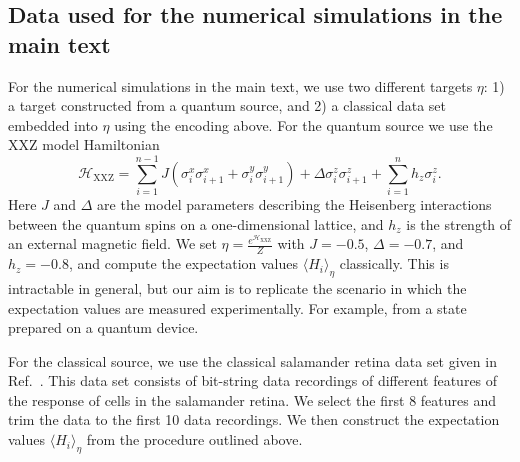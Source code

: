\documentclass[
    aps,
    prx,
    floatfix,
    nofootinbib,
    onecolumn
]{revtex4-2}
\begin{document}
\subsection{Data used for the numerical simulations in the main text}
\label{app:numdatasets}

For the numerical simulations in the main text, we use two different targets $\eta$: 1) a target constructed from a quantum source, and 2) a classical data set embedded into $\eta$ using the encoding above. For the quantum source we use the XXZ model Hamiltonian 
\begin{equation}\label{eq:xxz}
    \mathcal{H}_{\mathrm{XXZ}} =\sum_{i=1}^{n-1}J\left(\sigma^{x}_i\sigma^{x}_{i+1}+\sigma^y_i\sigma^y_{i+1}\right)+\Delta \sigma_i^z\sigma^z_{i+1} + \sum_{i=1}^n h_z \sigma_i^z.
\end{equation} 
Here $J$ and $\Delta$ are the model parameters describing the Heisenberg interactions between the quantum spins on a one-dimensional lattice, and $h_z$ is the strength of an external magnetic field. We set $\eta=\frac{e^{\mathcal{H}_{\mathrm{XXZ}}}}{Z}$ with $J=-0.5$, $\Delta=-0.7$, and $h_z =- 0.8$, and compute the expectation values $\langle H_i\rangle_\eta$ classically. This is intractable in general, but our aim is to replicate the scenario in which the expectation values are measured experimentally. For example, from a state prepared on a quantum device. 

For the classical source, we use the classical salamander retina data set given in Ref.~\cite{Tkacik2014}. This data set consists of bit-string data recordings of different features of the response of cells in the salamander retina. We select the first $8$ features and trim the data to the first 10 data recordings. We then construct the expectation values $\langle H_i \rangle_\eta$ from the procedure outlined above.   
\end{document}
